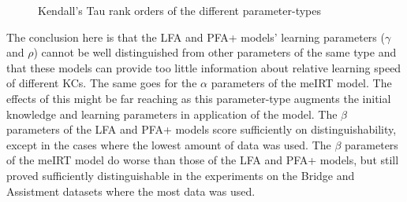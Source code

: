 \documentclass{scrartcl}
\begin{document}
\begin{figure}[h]
\centering

\hspace{0mm}
\hspace{0mm}
\caption{Kendall's Tau rank orders of the different parameter-types}
\label{fig:ranks}
\end{figure}

The conclusion here is that the LFA and PFA+ models' learning parameters ($\gamma$ and $\rho$) cannot be well distinguished from other parameters of the same type and that these models can provide too little information about relative learning speed of different KCs. The same goes for the $\alpha$ parameters of the meIRT model. The effects of this might be far reaching as this parameter-type augments the initial knowledge and learning parameters in application of the model. The $\beta$ parameters of the LFA and PFA+ models score sufficiently on distinguishability, except in the cases where the lowest amount of data was used. The $\beta$ parameters of the meIRT model do worse than those of the LFA and PFA+ models, but still proved sufficiently distinguishable in the experiments on the Bridge and Assistment datasets where the most data was used.  
\end{document}
